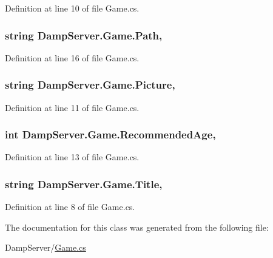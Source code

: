 Definition at line 10 of file Game.\-cs.

\hypertarget{class_damp_server_1_1_game_a1dd8dbbdd5596923b8858517a5f85a30}{
\subsubsection[{Path}]{\setlength{\rightskip}{0pt plus 5cm}string Damp\-Server.\-Game.\-Path\hspace{0.3cm}{\ttfamily [get]}, {\ttfamily [set]}}}\label{class_damp_server_1_1_game_a1dd8dbbdd5596923b8858517a5f85a30}


Definition at line 16 of file Game.\-cs.

\hypertarget{class_damp_server_1_1_game_a29a550376f14967880bfc526015ccf0b}{
\subsubsection[{Picture}]{\setlength{\rightskip}{0pt plus 5cm}string Damp\-Server.\-Game.\-Picture\hspace{0.3cm}{\ttfamily [get]}, {\ttfamily [set]}}}\label{class_damp_server_1_1_game_a29a550376f14967880bfc526015ccf0b}


Definition at line 11 of file Game.\-cs.

\hypertarget{class_damp_server_1_1_game_a06678034e2189af84043d880debefd8e}{
\subsubsection[{Recommended\-Age}]{\setlength{\rightskip}{0pt plus 5cm}int Damp\-Server.\-Game.\-Recommended\-Age\hspace{0.3cm}{\ttfamily [get]}, {\ttfamily [set]}}}\label{class_damp_server_1_1_game_a06678034e2189af84043d880debefd8e}


Definition at line 13 of file Game.\-cs.

\hypertarget{class_damp_server_1_1_game_a5c1efa7c9c5020a797116a0913e536b9}{
\subsubsection[{Title}]{\setlength{\rightskip}{0pt plus 5cm}string Damp\-Server.\-Game.\-Title\hspace{0.3cm}{\ttfamily [get]}, {\ttfamily [set]}}}\label{class_damp_server_1_1_game_a5c1efa7c9c5020a797116a0913e536b9}


Definition at line 8 of file Game.\-cs.



The documentation for this class was generated from the following file\-:\begin{DoxyCompactItemize}
\item 
Damp\-Server/\hyperlink{_game_8cs}{Game.\-cs}\end{DoxyCompactItemize}
